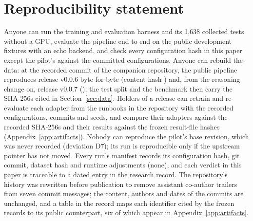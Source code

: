 \section{Reproducibility statement}\label{sec:repro}
Anyone can run the training and evaluation harness and its 1,638 collected tests without a GPU, evaluate the pipeline end to end on the public development fixtures with an echo backend, and check every configuration hash in this paper except the pilot's against the committed configurations. Anyone can rebuild the data: at the recorded commit of the companion repository, the public pipeline reproduces release v0.0.6 byte for byte (content hash ) and, from the reasoning change on, release v0.0.7 (); the test split and the benchmark then carry the SHA-256s cited in Section~\ref{sec:data}. Holders of a release can retrain and re-evaluate each adapter from the runbooks in the repository with the recorded configurations, commits and seeds, and compare their adapters against the recorded SHA-256s and their results against the frozen result-file hashes (Appendix~\ref{app:artifacts}). Nobody can reproduce the pilot's base revision, which was never recorded (deviation D7); its run is reproducible only if the upstream  pointer has not moved. Every run's manifest records its configuration hash, git commit, dataset hash and runtime adjustments (none), and each verdict in this paper is traceable to a dated entry in the research record. The repository's history was rewritten before publication to remove assistant co-author trailers from seven commit messages; the content, authors and dates of the commits are unchanged, and a table in the record maps each identifier cited by the frozen records to its public counterpart, six of which appear in Appendix~\ref{app:artifacts}.
